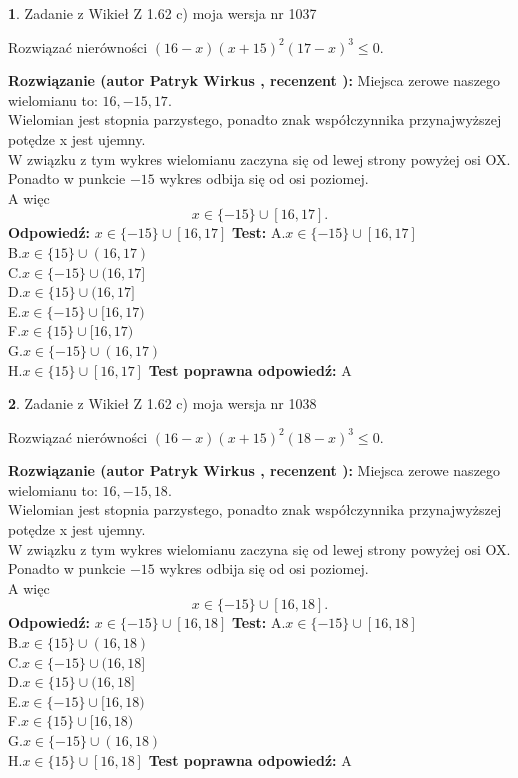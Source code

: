 \documentclass[12pt, a4paper]{article}
\theoremstyle{definition} %
\newtheorem{zad}{}
\newcommand{\zadStart}[1]{\begin{zad}#1\newline}
\newcommand{\zadStop}{\end{zad}}
\newcommand{\rozwStart}[2]{\noindent \textbf{Rozwiązanie (autor #1 , recenzent #2): }\newline}
\newcommand{\rozwStop}{\newline}
\newcommand{\odpStart}{\noindent \textbf{Odpowiedź:}\newline}
\newcommand{\odpStop}{\newline}
\newcommand{\testStart}{\noindent \textbf{Test:}\newline}
\newcommand{\testStop}{\newline}
\newcommand{\kluczStart}{\noindent \textbf{Test poprawna odpowiedź:}\newline}
\newcommand{\kluczStop}{\newline}
\begin{document}
\zadStart{Zadanie z Wikieł Z 1.62 c) moja wersja nr 1037}

Rozwiązać nierówności $(16-x)(x+15)^{2}(17-x)^{3}\le0$.
\zadStop
\rozwStart{Patryk Wirkus}{}
Miejsca zerowe naszego wielomianu to: $16, -15, 17$.\\
Wielomian jest stopnia parzystego, ponadto znak współczynnika przy\linebreak najwyższej potędze x jest ujemny.\\ W związku z tym wykres wielomianu zaczyna się od lewej strony powyżej osi OX.\\
Ponadto w punkcie $-15$ wykres odbija się od osi poziomej.\\
A więc $$x \in \{-15\} \cup [16,17].$$
\rozwStop
\odpStart
$x \in \{-15\} \cup [16,17]$
\odpStop
\testStart
A.$x \in \{-15\} \cup [16,17]$\\
B.$x \in \{15\} \cup (16,17)$\\
C.$x \in \{-15\} \cup (16,17]$\\
D.$x \in \{15\} \cup (16,17]$\\
E.$x \in \{-15\} \cup [16,17)$\\
F.$x \in \{15\} \cup [16,17)$\\
G.$x \in \{-15\} \cup (16,17)$\\
H.$x \in \{15\} \cup [16,17]$
\testStop
\kluczStart
A
\kluczStop



\zadStart{Zadanie z Wikieł Z 1.62 c) moja wersja nr 1038}

Rozwiązać nierówności $(16-x)(x+15)^{2}(18-x)^{3}\le0$.
\zadStop
\rozwStart{Patryk Wirkus}{}
Miejsca zerowe naszego wielomianu to: $16, -15, 18$.\\
Wielomian jest stopnia parzystego, ponadto znak współczynnika przy\linebreak najwyższej potędze x jest ujemny.\\ W związku z tym wykres wielomianu zaczyna się od lewej strony powyżej osi OX.\\
Ponadto w punkcie $-15$ wykres odbija się od osi poziomej.\\
A więc $$x \in \{-15\} \cup [16,18].$$
\rozwStop
\odpStart
$x \in \{-15\} \cup [16,18]$
\odpStop
\testStart
A.$x \in \{-15\} \cup [16,18]$\\
B.$x \in \{15\} \cup (16,18)$\\
C.$x \in \{-15\} \cup (16,18]$\\
D.$x \in \{15\} \cup (16,18]$\\
E.$x \in \{-15\} \cup [16,18)$\\
F.$x \in \{15\} \cup [16,18)$\\
G.$x \in \{-15\} \cup (16,18)$\\
H.$x \in \{15\} \cup [16,18]$
\testStop
\kluczStart
A
\kluczStop
\end{document}

